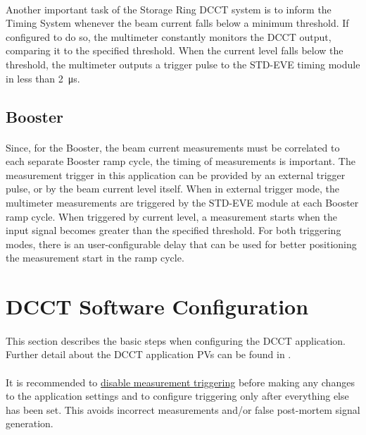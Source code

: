 \documentclass[openany]{article}
\begin{document}
		\paragraph{} Another important task of the Storage Ring DCCT system is to inform the Timing System whenever the beam current falls below a minimum threshold. If configured to do so, the multimeter constantly monitors the DCCT output, comparing it to the specified threshold. When the current level falls below the threshold, the multimeter outputs a trigger pulse to the STD-EVE timing module in less than \SI{2}{\micro\second}.

	\subsection{Booster} 

		\paragraph{} Since, for the Booster, the beam current measurements must be correlated to each separate Booster ramp cycle, the timing of measurements is important. The measurement trigger in this application can be provided by an external trigger pulse, or by the beam current level itself. When in external trigger mode, the multimeter measurements are triggered by the STD-EVE module at each Booster ramp cycle. When triggered by current level, a measurement starts when the input signal becomes greater than the specified threshold. For both triggering modes, there is an user-configurable delay that can be used for better positioning the measurement start in the ramp cycle.

\section{DCCT Software Configuration}

	\paragraph{} This section describes the basic steps when configuring the DCCT application. Further detail about the DCCT application PVs can be found in \emph{}.

	\paragraph{} It is recommended to \hyperref[disable-triggering]{disable measurement triggering} before making any changes to the application settings and to configure triggering only after everything else has been set. This avoids incorrect measurements and/or false post-mortem signal generation.
\end{document}
